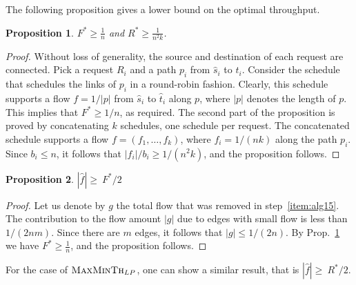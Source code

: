\documentclass[11pt]{article}
\newenvironment{proof sketch}{\noindent {\bf Proof sketch:} }{\hfill \qed}
\newtheorem{proposition}{Proposition}
\newcommand{\LPmin}{\textsc{MaxMinTh}_{LP}}
\begin{document}
\noindent
The following proposition gives a lower bound on the optimal throughput.
\begin{proposition} \label{prop:thh1}
    $F^* \geq \frac 1n$ and $R^*\geq \frac{1}{n^2k}$.
\end{proposition}
\begin{proof}
  Without loss of generality, the source and destination of each
  request are connected.  Pick a request $R_i$ and a path $p_i$ from
  ${\hat s}_i$ to ${\hat t}_i$.  Consider the schedule that schedules the links of
  $p_i$ in a round-robin fashion. Clearly, this schedule supports a
  flow $f=1/|p|$ from ${\hat s}_i$ to ${\hat t}_i$ along $p$, where $|p|$ denotes
  the length of $p$. This implies that $F^*\geq 1/n$, as required.
  The second part of the proposition is proved by concatenating $k$
  schedules, one schedule per request. The concatenated schedule
  supports a flow $f=(f_1,\ldots,f_k)$, where $f_i=1/(nk)$ along the
  path $p_i$. Since $b_i\leq n$, it follows that $|f_i|/b_i \geq
  1/(n^2k)$, and the proposition follows.
\end{proof}

\begin{proposition}\label{prop:miniscale}
$|{\hat f}| \geq\ F^*/2$
\end{proposition}
\begin{proof}
  Let us denote by $g$ the total flow that was removed in step~\ref{item:alg15}.
  The contribution to the flow amount $|g|$ due to edges with small flow is less
  than $1/(2nm)$.
  Since there are $m$
  edges, it follows that $|g| \leq 1/(2n)$.  By Prop.~\ref{prop:thh1} we have $F^* \geq
  \frac 1n$, and the proposition follows.
\end{proof}

\noindent
For the case of $\LPmin$, one can show a similar result, that is $|{\hat f}| \geq\ R^*/2$.
\end{document}
